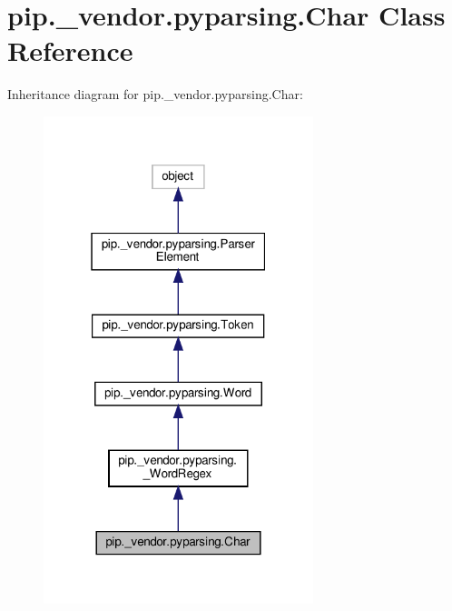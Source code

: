 \hypertarget{classpip_1_1__vendor_1_1pyparsing_1_1Char}{}\section{pip.\+\_\+vendor.\+pyparsing.\+Char Class Reference}
\label{classpip_1_1__vendor_1_1pyparsing_1_1Char}


Inheritance diagram for pip.\+\_\+vendor.\+pyparsing.\+Char\+:
\nopagebreak
\begin{figure}[H]
\begin{center}
\leavevmode
\includegraphics[width=223pt]{classpip_1_1__vendor_1_1pyparsing_1_1Char__inherit__graph}
\end{center}
\end{figure}


